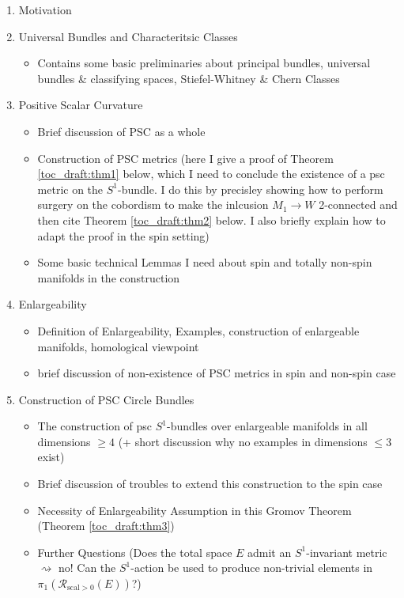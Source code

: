 \begin{enumerate}[label=\arabic*)]
    \item Motivation
    \item Universal Bundles and Characteritsic Classes 
    \begin{itemize}
        \item Contains some basic preliminaries about principal bundles, universal bundles \& classifying spaces, Stiefel-Whitney \& Chern Classes
    \end{itemize}
    \item Positive Scalar Curvature
    \begin{itemize}
        \item Brief discussion of PSC as a whole
        \item Construction of PSC metrics (here I give a proof of Theorem \ref{toc_draft:thm1} below, which I need to conclude the existence of a psc metric on the $S^1$-bundle. I do this by precisley showing how to perform surgery on the cobordism to make the inlcusion $M_1 \to W$ 2-connected and then cite Theorem \ref{toc_draft:thm2} below. I also briefly explain how to adapt the proof in the spin setting)
        \item Some basic technical Lemmas I need about spin and totally non-spin manifolds in the construction
    \end{itemize}
    \item Enlargeability
    \begin{itemize}
        \item Definition of Enlargeability, Examples, construction of enlargeable manifolds, homological viewpoint
        \item brief discussion of non-existence of PSC metrics in spin and non-spin case
    \end{itemize}
    \item Construction of PSC Circle Bundles
    \begin{itemize}
        \item The construction of psc $S^1$-bundles over enlargeable manifolds in all dimensions $\geq 4$ (+ short discussion why no examples in dimensions $\leq 3$ exist)
        \item Brief discussion of troubles to extend this construction to the spin case
        \item Necessity of Enlargeability Assumption in this Gromov Theorem (Theorem \ref{toc_draft:thm3})
        \item Further Questions (Does the total space $E$ admit an $S^1$-invariant metric $\rightsquigarrow$ no! Can the $S^1$-action be used to produce non-trivial elements in $\pi_1(\mathcal{R}_{\mathrm{scal} > 0}(E))$?)
    \end{itemize}
\end{enumerate}


